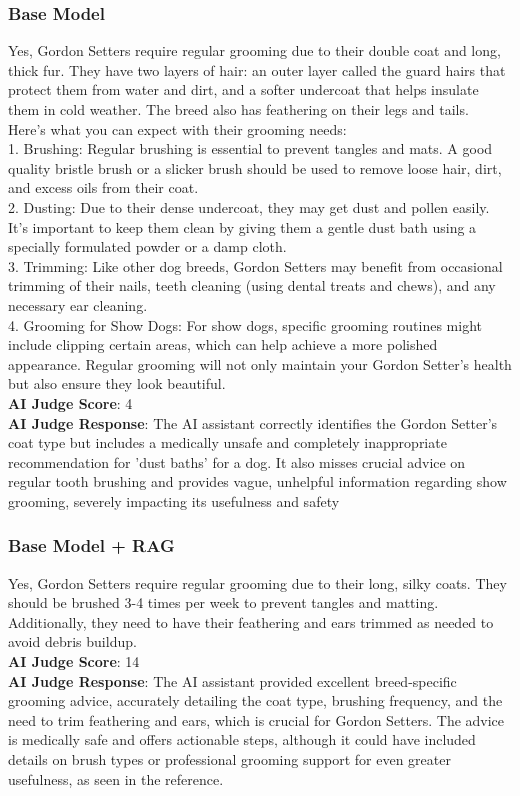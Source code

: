 \documentclass[10pt,twocolumn,letterpaper]{article}
\begin{document}
\subsubsection{Base Model}
Yes, Gordon Setters require regular grooming due to their double coat and long, thick fur. They have two layers of hair: an outer layer called the guard hairs that protect them from water and dirt, and a softer undercoat that helps insulate them in cold weather. The breed also has feathering on their legs and tails.\\
Here's what you can expect with their grooming needs:\\
1. Brushing: Regular brushing is essential to prevent tangles and mats. A good quality bristle brush or a slicker brush should be used to remove loose hair, dirt, and excess oils from their coat.\\
2. Dusting: Due to their dense undercoat, they may get dust and pollen easily. It’s important to keep them clean by giving them a gentle dust bath using a specially formulated powder or a damp cloth.\\
3. Trimming: Like other dog breeds, Gordon Setters may benefit from occasional trimming of their nails, teeth cleaning (using dental treats and chews), and any necessary ear cleaning.\\
4. Grooming for Show Dogs: For show dogs, specific grooming routines might include clipping certain areas, which can help achieve a more polished appearance. Regular grooming will not only maintain your Gordon Setter’s health but also ensure they look beautiful.\\
\textbf{AI Judge Score}: 4\\
\textbf{AI Judge Response}: The AI assistant correctly identifies the Gordon Setter's coat type but includes a medically unsafe and completely inappropriate recommendation for 'dust baths' for a dog. It also misses crucial advice on regular tooth brushing and provides vague, unhelpful information regarding show grooming, severely impacting its usefulness and safety\\

\subsubsection{Base Model + RAG}
Yes, Gordon Setters require regular grooming due to their long, silky coats. They should be brushed 3-4 times per week to prevent tangles and matting. Additionally, they need to have their feathering and ears trimmed as needed to avoid debris buildup.\\
\textbf{AI Judge Score}: 14\\
\textbf{AI Judge Response}: The AI assistant provided excellent breed-specific grooming advice, accurately detailing the coat type, brushing frequency, and the need to trim feathering and ears, which is crucial for Gordon Setters. The advice is medically safe and offers actionable steps, although it could have included details on brush types or professional grooming support for even greater usefulness, as seen in the reference.\\
\end{document}
